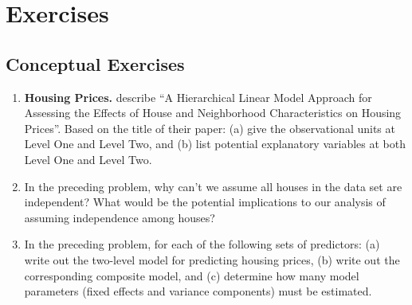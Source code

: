 \documentclass[
]{krantz}
\begin{document}
\hypertarget{exercises}{%
\section{Exercises}\label{exercises}}

\hypertarget{conceptual-exercises}{%
\subsection{Conceptual Exercises}\label{conceptual-exercises}}

\begin{enumerate}
\def\labelenumi{\arabic{enumi}.}
\item
  \textbf{Housing Prices.} \citet{Brown2004} describe ``A Hierarchical Linear Model Approach for Assessing the Effects of House and Neighborhood Characteristics on Housing Prices''. Based on the title of their paper: (a) give the observational units at Level One and Level Two, and (b) list potential explanatory variables at both Level One and Level Two.
\item
  In the preceding problem, why can't we assume all houses in the data set are independent? What would be the potential implications to our analysis of assuming independence among houses?
\item
  In the preceding problem, for each of the following sets of predictors: (a) write out the two-level model for predicting housing prices, (b) write out the corresponding composite model, and (c) determine how many model parameters (fixed effects and variance components) must be estimated.


\end{enumerate}
\end{document}
